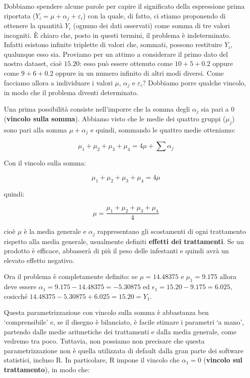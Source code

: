 \documentclass[a4paper,12pt,oneside]{book}
\begin{document}
Dobbiamo spendere alcune parole per capire il significato della espressione prima riportata (\(Y_i = \mu + \alpha_j + \varepsilon_i\)) con la quale, di fatto, ci stiamo proponendo di ottenere la quantità \(Y_i\) (ognuno dei dati osservati) come somma di tre valori incogniti. È chiaro che, posto in questi termini, il problema è indeterminato. Infatti esistono infinite triplette di valori che, sommati, possono restituire \(Y_i\), qualunque esso sia. Proviamo per un attimo a considerare il primo dato del nostro dataset, cioè \(15.20\): esso può essere ottenuto come \(10 + 5 + 0.2\) oppure come \(9 + 6 + 0.2\) oppure in un numero infinito di altri modi diversi. Come facciamo allora a individuare i valori \(\mu\), \(\alpha_j\) e \(\varepsilon_i\)? Dobbiamo porre qualche vincolo, in modo che il problema diventi determinato.

Una prima possibilità consiste nell'imporre che la somma degli \(\alpha_j\) sia pari a 0 (\textbf{vincolo sulla somma}). Abbiamo visto che le medie dei quattro gruppi (\(\mu_j\)) sono pari alla somma \(\mu + \alpha_j\) e quindi, sommando le quattro medie otteniamo:

\[ \mu_1 + \mu_2 + \mu_3 + \mu_4 = 4 \mu + \sum{\alpha_j}\]

Con il vincolo sulla somma:

\[ \mu_1 + \mu_2 + \mu_3 + \mu_4 = 4 \mu\]

quindi:

\[\mu = \frac{\mu_1 + \mu_2 + \mu_3 + \mu_4}{4} \]

cioè \(\mu\) è la media generale e \(\alpha_j\) rappresentano gli scostamenti di ogni trattamento rispetto alla media generale, usualmente definiti \textbf{effetti dei trattamenti}. Se un prodotto è efficace, abbasserà di più il peso delle infestanti e quindi avrà un elevato effetto negativo.

Ora il problema è completamente definito: se \(\mu = 14.48375\) e \(\mu_1 = 9.175\) allora deve essere \(\alpha_1 = 9.175 - 14.48375 = -5.30875\) ed \(\epsilon_1 = 15.20 - 9.175 = 6.025\), cosicché \(14.48375 - 5.30875 + 6.025 = 15.20 = Y_1\).

Questa parametrizzazione con vincolo sulla somma è abbastanza ben `comprensibile' e, se il disegno è bilanciato, è facile stimare i parametri `a mano', partendo dalle medie aritmetiche dei trattamenti e dalla media generale, come vedremo tra poco. Tuttavia, non possiamo non precisare che questa parametrizzazione non è quella utilizzata di default dalla gran parte dei software statistici, incluso R. In particolare, R impone il vincolo che \(\alpha_1 = 0\) (\textbf{vincolo sul trattamento}), in modo che:
\end{document}
